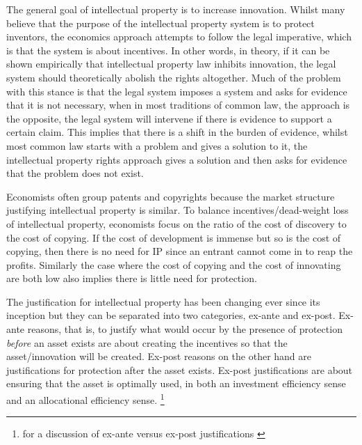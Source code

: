 \documentclass[12pt]{article}
\numberwithin{equation}{section}
\begin{document}
The general goal of intellectual property is to increase innovation. Whilst many believe that the purpose of the intellectual property system is to protect inventors, the economics approach attempts to follow the legal imperative, which is that the system is about incentives. In other words, in theory, if it can be shown empirically that intellectual property law inhibits innovation, the legal system should theoretically abolish the rights altogether. Much of the problem with this stance is that the legal system imposes a system and asks for evidence that it is not necessary, when in most traditions of common law, the approach is the opposite, the legal system will intervene if there is evidence to support a certain claim. This implies that there is a shift in the burden of evidence, whilst most common law starts with a problem and gives a solution to it, the intellectual property rights approach gives a solution and then asks for evidence that the problem does not exist. 

Economists often group patents and copyrights because the market structure justifying intellectual property is similar. To balance incentives/dead-weight loss of intellectual property, economists focus on the ratio of the cost of discovery to the cost of copying. If the cost of development is immense but so is the cost of copying, then there is no need for IP since an entrant cannot come in to reap the profits. Similarly the case where the cost of copying and the cost of innovating are both low also implies there is little need for protection. 


The justification for intellectual property has been changing ever since its inception but they can be separated into two categories, ex-ante and ex-post. Ex-ante reasons, that is, to justify what would occur by the presence of protection \textit{before} an asset exists are about creating the incentives so that the asset/innovation will be created. Ex-post reasons on the other hand are justifications for protection after the asset exists. Ex-post justifications are about ensuring that the asset is optimally used, in both an investment efficiency sense and an allocational efficiency sense. \footnote{for a discussion of ex-ante versus ex-post justifications \cite{Lemleyt2004}}
\end{document}
